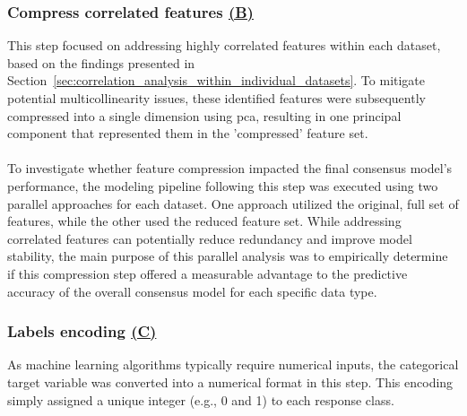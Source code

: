 \documentclass[12pt,a4paper]{report}
\begin{document}
\subsubsection*{Compress correlated features \hyperref[fig:pipeline-1]{(B)}}
This step focused on addressing highly correlated features within each dataset, based on the findings presented in Section~\ref{sec:correlation_analysis_within_individual_datasets}. To mitigate potential multicollinearity issues, these identified features were subsequently compressed into a single dimension using \gls{pca}, resulting in one principal component that represented them in the 'compressed' feature set.\\
\\
To investigate whether feature compression impacted the final consensus model's performance, the modeling pipeline following this step was executed using two parallel approaches for each dataset. One approach utilized the original, full set of features, while the other used the reduced feature set. While addressing correlated features can potentially reduce redundancy and improve model stability, the main purpose of this parallel analysis was to empirically determine if this compression step offered a measurable advantage to the predictive accuracy of the overall consensus model for each specific data type.

\subsubsection*{Labels encoding \hyperref[fig:pipeline-1]{(C)}}
As machine learning algorithms typically require numerical inputs, the categorical target variable was converted into a numerical format in this step. This encoding simply assigned a unique integer (e.g., 0 and 1) to each response class.
\end{document}
